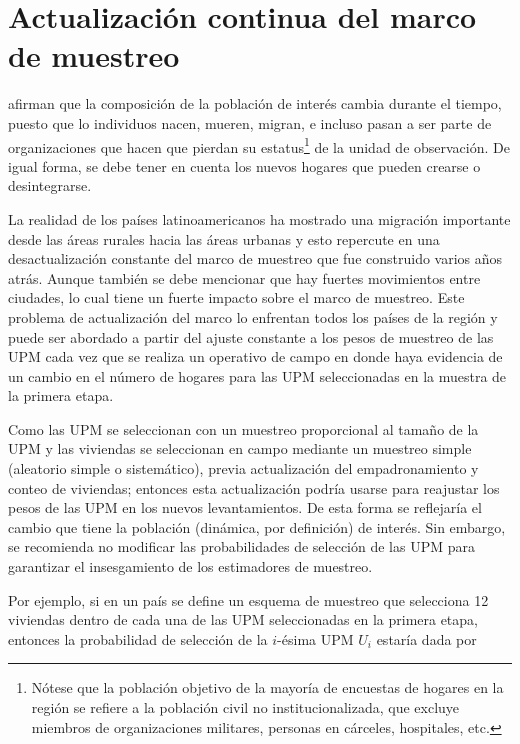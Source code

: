 \documentclass[
  12pt,
]{book}
\begin{document}
\hypertarget{actualizaciuxf3n-continua-del-marco-de-muestreo}{%
\section{Actualización continua del marco de muestreo}\label{actualizaciuxf3n-continua-del-marco-de-muestreo}}

\citet[pág. 105]{Duncan_Kalton_1987} afirman que la composición de la población de interés cambia durante el tiempo, puesto que lo individuos nacen, mueren, migran, e incluso pasan a ser parte de organizaciones que hacen que pierdan su estatus\footnote{Nótese que la población objetivo de la mayoría de encuestas de hogares en la región se refiere a la población civil no institucionalizada, que excluye miembros de organizaciones militares, personas en cárceles, hospitales, etc.} de la unidad de observación. De igual forma, se debe tener en cuenta los nuevos hogares que pueden crearse o desintegrarse.

La realidad de los países latinoamericanos ha mostrado una migración importante desde las áreas rurales hacia las áreas urbanas y esto repercute en una desactualización constante del marco de muestreo que fue construido varios años atrás. Aunque también se debe mencionar que hay fuertes movimientos entre ciudades, lo cual tiene un fuerte impacto sobre el marco de muestreo. Este problema de actualización del marco lo enfrentan todos los países de la región y puede ser abordado a partir del ajuste constante a los pesos de muestreo de las UPM cada vez que se realiza un operativo de campo en donde haya evidencia de un cambio en el número de hogares para las UPM seleccionadas en la muestra de la primera etapa.

Como las UPM se seleccionan con un muestreo proporcional al tamaño de la UPM y las viviendas se seleccionan en campo mediante un muestreo simple (aleatorio simple o sistemático), previa actualización del empadronamiento y conteo de viviendas; entonces esta actualización podría usarse para reajustar los pesos de las UPM en los nuevos levantamientos. De esta forma se reflejaría el cambio que tiene la población (dinámica, por definición) de interés. Sin embargo, se recomienda no modificar las probabilidades de selección de las UPM para garantizar el insesgamiento de los estimadores de muestreo.

Por ejemplo, si en un país se define un esquema de muestreo que selecciona 12 viviendas dentro de cada una de las UPM seleccionadas en la primera etapa, entonces la probabilidad de selección de la \(i\)-ésima UPM \(U_i\) estaría dada por
\end{document}
